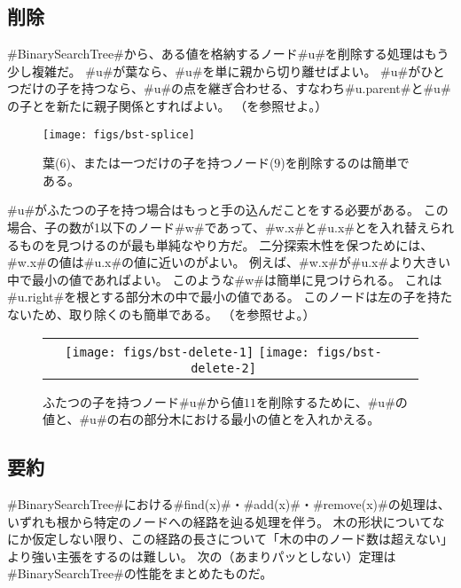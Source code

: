 \subsection{削除}

#BinarySearchTree#から、ある値を格納するノード#u#を削除する処理はもう少し複雑だ。
#u#が葉なら、#u#を単に親から切り離せばよい。
#u#がひとつだけの子を持つなら、#u#の点を継ぎ合わせる、すなわち#u.parent#と#u#の子とを新たに親子関係とすればよい。
（を参照せよ。）

\begin{figure}
  \begin{center}
    \texttt{[image: figs/bst-splice]}
  \end{center}
  \caption{葉($6$)、または一つだけの子を持つノード($9$)を削除するのは簡単である。}
\end{figure}

#u#がふたつの子を持つ場合はもっと手の込んだことをする必要がある。
この場合、子の数が1以下のノード#w#であって、#w.x#と#u.x#とを入れ替えられるものを見つけるのが最も単純なやり方だ。
二分探索木性を保つためには、#w.x#の値は#u.x#の値に近いのがよい。
例えば、#w.x#が#u.x#より大きい中で最小の値であればよい。
このような#w#は簡単に見つけられる。
これは#u.right#を根とする部分木の中で最小の値である。
このノードは左の子を持たないため、取り除くのも簡単である。
（を参照せよ。）

\begin{figure}
  \begin{center}
    \begin{tabular}{cc}
    \texttt{[image: figs/bst-delete-1]}
    \texttt{[image: figs/bst-delete-2]}
    \end{tabular}
  \end{center}
  \caption{ふたつの子を持つノード#u#から値$11$を削除するために、#u#の値と、#u#の右の部分木における最小の値とを入れかえる。}
\end{figure}

\subsection{要約}

#BinarySearchTree#における#find(x)#・#add(x)#・#remove(x)#の処理は、いずれも根から特定のノードへの経路を辿る処理を伴う。
木の形状についてなにか仮定しない限り、この経路の長さについて「木の中のノード数は超えない」より強い主張をするのは難しい。
次の（あまりパッとしない）定理は#BinarySearchTree#の性能をまとめたものだ。

